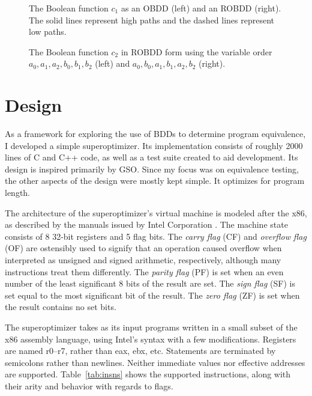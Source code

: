\documentclass[a4paper,11pt]{kth-mag}
\begin{document}
\begin{figure}
\centering

\caption{The Boolean function $c_1$ as an OBDD (left) and an ROBDD (right). The solid lines represent high paths and the dashed lines represent low paths.}
\label{fig:bdd_c1}
\end{figure}

\begin{figure}
\centering

\caption{The Boolean function $c_2$ in ROBDD form using the variable order $a_0,a_1,a_2,b_0,b_1,b_2$ (left) and $a_0,b_0,a_1,b_1,a_2,b_2$ (right).}
\label{fig:bdd_c2_bad}
\end{figure}

\chapter{Design}
\label{ch:design}

As a framework for exploring the use of BDDs to determine program equivalence, I developed a simple superoptimizer.
Its implementation consists of roughly 2000 lines of C and C++ code, as well as a test suite created to aid development.
Its design is inspired primarily by GSO.
Since my focus was on equivalence testing, the other aspects of the design were mostly kept simple.
It optimizes for program length.

The architecture of the superoptimizer's virtual machine is modeled after the x86, as described by the manuals issued by Intel Corporation \cite{intel_1,intel_2a,intel_2b}. %
The machine state consists of 8 32-bit registers and 5 flag bits.
The \emph{carry flag} (CF) and \emph{overflow flag} (OF) are ostensibly used to signify that an operation caused overflow when interpreted as unsigned and signed arithmetic, respectively, although many instructions treat them differently.
The \emph{parity flag} (PF) is set when an even number of the least significant 8 bits of the result are set.
The \emph{sign flag} (SF) is set equal to the most significant bit of the result.
The \emph{zero flag} (ZF) is set when the result contains no set bits.

The superoptimizer takes as its input programs written in a small subset of the x86 assembly language, using Intel's syntax with a few modifications.
Registers are named r0--r7, rather than eax, ebx, etc.
Statements are terminated by semicolons rather than newlines.
Neither immediate values nor effective addresses are supported.
Table~\ref{tab:insns} shows the supported instructions, along with their arity and behavior with regards to flags.
\end{document}
